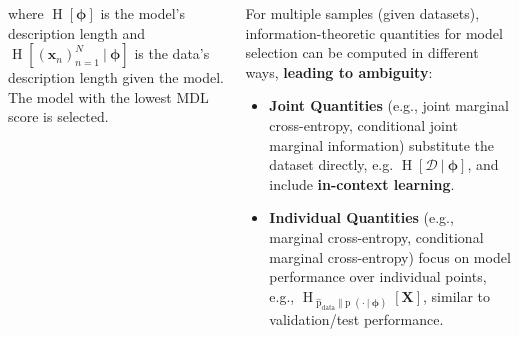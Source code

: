 \documentclass[25pt,a0paper,landscape]{tikzposter}
\newcommand{\MidSymbol}[1][]{\:#1\:}
\newcommand{\given}{\MidSymbol[\vert]}
\DeclareMathOperator{\opInformationContent}{H}
\newcommand{\ICof}[1]{\opInformationContent[#1]}
\DeclareMathOperator{\opEntropy}{H}
\newcommand{\Hof}[1]{\opEntropy[#1]}
\newcommand{\iCrossEntropy}[3]{\opEntropy_{#1 \Vert #2}[#3]}
\DeclareMathOperator{\opp}{p}
\newcommand{\pof}[1]{\opp(#1)}
\newcommand{\h}{\boldsymbol{\phi}}
\newcommand{\xNset}{(\x_n)_{n=1}^N}
\newcommand{\x}{\boldsymbol{x}}
\newcommand{\X}{\boldsymbol{X}}
\newcommand{\oppdata}{\hat{\opp}_{\text{data}}}
\newcommand{\Dataset}{\mathcal{D}}
\begin{document}
\begin{columns}
{{\begin{backgroundbox}[title=Minimum Description Length (MDL)/MLE/MAP]
\begin{equation}
      \end{equation}
      where $\ICof{\h}$ is the model's description length and $\ICof{\xNset \given \h}$ is the data's description length given the model. The model with the lowest MDL score is selected.
    \end{backgroundbox}
    \begin{theorybox}[title=Multiple vs Individual Points]
      For multiple samples (given datasets), information-theoretic quantities for model selection can be computed in different ways, \textbf{leading to ambiguity}:
      \begin{itemize}
      \item \textbf{Joint Quantities} (e.g., joint marginal cross-entropy, conditional joint marginal information) substitute the dataset directly, e.g. $\Hof{\Dataset\given\h}$, and include \textbf{in-context learning}.
      \item \textbf{Individual Quantities} (e.g., marginal cross-entropy, conditional marginal cross-entropy) focus on model performance over individual points, e.g., $\iCrossEntropy{\oppdata}{\pof{\cdot \given \h}}{\X}$, similar to validation/test performance.
      \end{itemize}
    \end{theorybox}
  }
  }
\end{columns}
\end{document}
